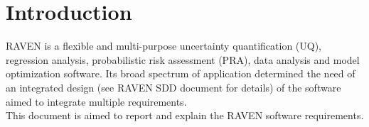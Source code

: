 \section{Introduction}
RAVEN is a flexible and multi-purpose uncertainty quantification (UQ), regression analysis, probabilistic risk assessment 
(PRA), data analysis and model optimization software.  
Its broad spectrum of application determined the need of an integrated design (see RAVEN SDD document for  details)
of the software aimed to integrate multiple requirements.
\\This document is aimed to report and explain the RAVEN software requirements.
